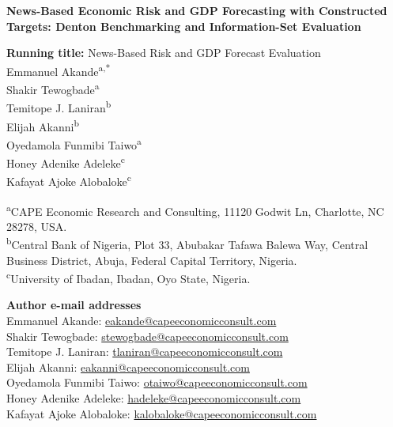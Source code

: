 \documentclass[12pt]{article}
\begin{document}
\begin{center}
{\Large\bfseries News-Based Economic Risk and GDP Forecasting with Constructed Targets: Denton Benchmarking and Information-Set Evaluation\par}
\vspace{0.15cm}
\textbf{Running title:} News-Based Risk and GDP Forecast Evaluation\\
\vspace{0.12cm}
Emmanuel Akande\textsuperscript{a,*}\\
Shakir Tewogbade\textsuperscript{a}\\
Temitope J. Laniran\textsuperscript{b}\\
Elijah Akanni\textsuperscript{b}\\
Oyedamola Funmibi Taiwo\textsuperscript{a}\\
Honey Adenike Adeleke\textsuperscript{c}\\
Kafayat Ajoke Alobaloke\textsuperscript{c}
\end{center}
\vspace{0.2cm}
\textsuperscript{a}CAPE Economic Research and Consulting, 11120 Godwit Ln, Charlotte, NC 28278, USA.\\
\textsuperscript{b}Central Bank of Nigeria, Plot 33, Abubakar Tafawa Balewa Way, Central Business District, Abuja, Federal Capital Territory, Nigeria.\\
\textsuperscript{c}University of Ibadan, Ibadan, Oyo State, Nigeria.

\textbf{Author e-mail addresses}\\
Emmanuel Akande: \href{mailto:eakande@capeeconomicconsult.com}{eakande@capeeconomicconsult.com}\\
Shakir Tewogbade: \href{mailto:stewogbade@capeeconomicconsult.com}{stewogbade@capeeconomicconsult.com}\\
Temitope J. Laniran: \href{mailto:tlaniran@capeeconomicconsult.com}{tlaniran@capeeconomicconsult.com}\\
Elijah Akanni: \href{mailto:eakanni@capeeconomicconsult.com}{eakanni@capeeconomicconsult.com}\\
Oyedamola Funmibi Taiwo: \href{mailto:otaiwo@capeeconomicconsult.com}{otaiwo@capeeconomicconsult.com}\\
Honey Adenike Adeleke: \href{mailto:hadeleke@capeeconomicconsult.com}{hadeleke@capeeconomicconsult.com}\\
Kafayat Ajoke Alobaloke: \href{mailto:kalobaloke@capeeconomicconsult.com}{kalobaloke@capeeconomicconsult.com}
\end{document}
